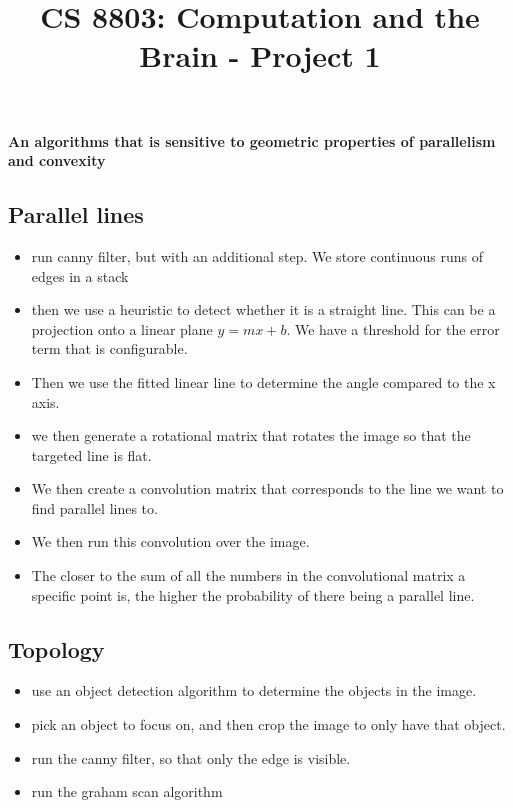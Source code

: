 \documentclass{article}
\title{CS 8803: Computation and the Brain - Project 1}
\begin{document}
\maketitle

\textbf{An algorithms that is sensitive to geometric properties of parallelism and convexity}

\subsection{Parallel lines}

\begin{itemize}
\item run canny filter, but with an additional step. We store continuous runs of edges in a stack
\item then we use a heuristic to detect whether it is a straight line. This can be a projection onto a linear plane $y = mx + b$. We have a threshold for the error term that is configurable.
\item Then we use the fitted linear line to determine the angle compared to the x axis.
\item we then generate a rotational matrix that rotates the image so that the targeted line is flat.
\item We then create a convolution matrix that corresponds to the line we want to find parallel lines to.
\item We then run this convolution over the image.
\item The closer to the sum of all the numbers in the convolutional matrix a specific point is, the higher the probability of there being a parallel line.

\end{itemize}

\subsection{Topology}

\begin{itemize}
\item use an object detection algorithm to determine the objects in the image.
\item pick an object to focus on, and then crop the image to only have that object.
\item run the canny filter, so that only the edge is visible.
\item run the graham scan algorithm
\end{itemize}
\end{document}
